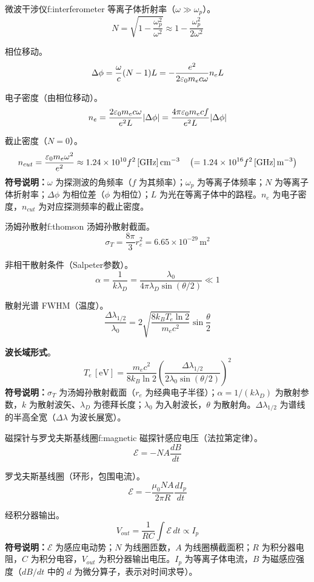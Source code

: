\begin{formulabox}{微波干涉仪}{f:interferometer}
等离子体折射率（$\omega \gg \omega_p$）。
\begin{equation}
    N = \sqrt{1 - \frac{\omega_p^2}{\omega^2}} \approx 1 - \frac{\omega_p^2}{2\omega^2}
\label{eq:ch12-refractive-index-ex}
\end{equation}

相位移动。
\[
    \Delta\phi = \frac{\omega}{c}(N-1)L = -\frac{e^2}{2\varepsilon_0 m_e c \omega} n_e L
\]

电子密度（由相位移动）。
\[
    n_e = \frac{2\varepsilon_0 m_e c \omega}{e^2 L} |\Delta\phi| = \frac{4\pi\varepsilon_0 m_e c f}{e^2 L} |\Delta\phi|
\]

截止密度（$N=0$）。
\[
    n_{cut} = \frac{\varepsilon_0 m_e \omega^2}{e^2} \approx 1.24\times10^{10} f^2\,[\mathrm{GHz}]
\,\mathrm{cm^{-3}} \quad\left(= 1.24\times10^{16} f^2\,[\mathrm{GHz}]\,\mathrm{m^{-3}}\right)
\]
\textbf{符号说明：}$\omega$ 为探测波的角频率（$f$ 为其频率）；$\omega_p$ 为等离子体频率；$N$ 为等离子体折射率；$\Delta\phi$ 为相位差（$\phi$ 为相位）；$L$ 为光在等离子体中的路程。$n_e$ 为电子密度，$n_{cut}$ 为对应探测频率的截止密度。
\end{formulabox}

\begin{formulabox}{汤姆孙散射}{f:thomson}
汤姆孙散射截面。
\[
    \sigma_T = \frac{8\pi}{3} r_e^2 = 6.65\times10^{-29}\,\mathrm{m^2}
\]

非相干散射条件（Salpeter参数）。
\[
    \alpha = \frac{1}{k\lambda_D} = \frac{\lambda_0}{4\pi\lambda_D\sin(\theta/2)} \ll 1
\]

散射光谱 FWHM（温度）。
\[
    \frac{\Delta\lambda_{1/2}}{\lambda_0} = 2\sqrt{\frac{8k_B T_e \ln 2}{m_e c^2}} \sin\frac{\theta}{2}
\]

\textbf{波长域形式}。
\[
    T_e\,[\mathrm{eV}] = \frac{m_e c^2}{8k_B \ln 2} \left(\frac{\Delta\lambda_{1/2}}{2\lambda_0 \sin(\theta/2)}\right)^2
\]
\textbf{符号说明：}$\sigma_T$ 为汤姆孙散射截面（$r_e$ 为经典电子半径）；$\alpha=1/(k\lambda_D)$ 为散射参数，$k$ 为散射波矢、$\lambda_D$ 为德拜长度；$\lambda_0$ 为入射波长，$\theta$ 为散射角。$\Delta\lambda_{1/2}$ 为谱线的半高全宽（$\Delta\lambda$ 为波长展宽）。
\end{formulabox}

\begin{formulabox}{磁探针与罗戈夫斯基线圈}{f:magnetic}
磁探针感应电压（法拉第定律）。
\[
    \mathcal{E} = -N A \frac{dB}{dt}
\]

罗戈夫斯基线圈（环形，包围电流）。
\[
    \mathcal{E} = -\frac{\mu_0 N A}{2\pi R} \frac{dI_p}{dt}
\]

经积分器输出。
\[
    V_{out} = \frac{1}{RC} \int \mathcal{E}\,dt \propto I_p
\]
\textbf{符号说明：}$\mathcal{E}$ 为感应电动势；$N$ 为线圈匝数，$A$ 为线圈横截面积；$R$ 为积分器电阻，$C$ 为积分电容，$V_{out}$ 为积分器输出电压。$I_p$ 为等离子体电流，$B$ 为磁感应强度（$dB/dt$ 中的 $d$ 为微分算子，表示对时间求导）。
\end{formulabox}

